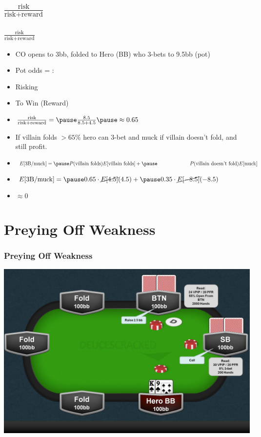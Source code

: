 \documentclass{beamer}
\begin{document}
\subsection{$\frac{\text{risk}}{\text{risk}+\text{reward}}$}
\begin{frame}
\frametitle{$\frac{\text{risk}}{\text{risk}+\text{reward}}$}
\begin{itemize}
\item CO opens to 3bb, folded to Hero (BB) who 3-bets to 9.5bb (pot)
\item Pot odds = :  \pause
\item Risking  \pause
\item To Win (Reward)  \pause
\item $\frac{\text{risk}}{\text{risk}+\text{reward}} = \pause \frac{8.5}{8.5+4.5} \pause \approx 0.65$ \pause
\item If villain folds $> 65\%$ hero can 3-bet and muck if villain doesn't fold, and still profit. \pause
\item $E[\text{3B/muck}] = \pause P(\text{villain folds})E[\text{villain folds}] + \pause \;\;\;\;\;\;\;\;\;\;\;\;\;\;\;\;\;\;\;\;\;\;\;P(\text{villain doesn't fold})E[\text{muck}]$ \pause
\item $E[\text{3B/muck}] =  \pause 0.65\cdot \cancel{E[4.5]}(4.5) +  \pause 0.35\cdot \cancel{E[-8.5]}(-8.5)$
\item $\approx 0$
\end{itemize}
\end{frame}



\section{Preying Off Weakness}
\begin{frame}
\frametitle{Preying Off Weakness}
\includegraphics[keepaspectratio=true,width=.75\paperwidth]{Weakness.png}
\end{frame}
\end{document}
